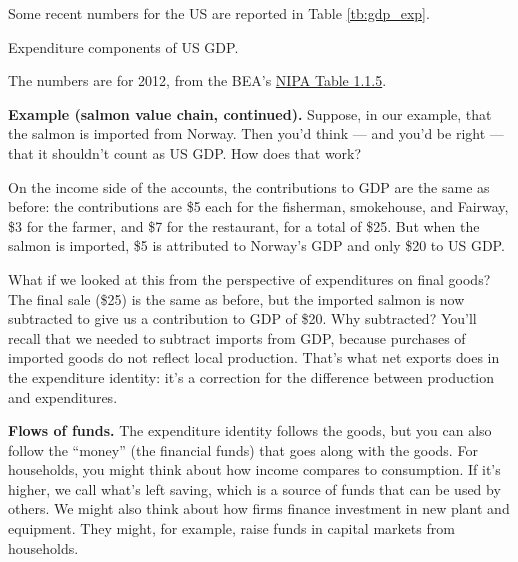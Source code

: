 Some recent numbers for the US are reported in Table \ref{tb:gdp_exp}.

\begin{table}[h!]
\centering
\caption{Expenditure components of US GDP.}
\label{tb:gdp_exp}

\begin{minipage}{0.95\textwidth}
\footnotesize{%
\smallskip
The numbers are for 2012,
from the BEA's
\href{http://www.bea.gov/iTable/iTableHtml.cfm?reqid=9&step=3&isuri=1&903=5}{NIPA Table 1.1.5}.
}
\end{minipage}
\end{table}

\textbf{Example (salmon value chain, continued).}
Suppose, in our example, that the salmon is imported from Norway.
Then you'd think --- and you'd be right --- that it shouldn't
count as US GDP.
How does that work?

On the income side of the accounts, the
contributions to GDP are the same as before:
the contributions are \$5 each for the fisherman,
smokehouse, and Fairway, \$3 for the farmer, and
\$7 for the restaurant, for a total of \$25.
But when the salmon is imported,
\$5 is attributed to Norway's GDP and only \$20 to US GDP.

What if we looked at this from the perspective of expenditures on final goods?
The final sale (\$25) is the same as before, but the imported
salmon is now subtracted to give us a contribution to GDP of \$20.
Why subtracted?  You'll recall that we needed to subtract imports
from GDP, because purchases of imported goods do not reflect
local production.
That's what net exports does in the expenditure identity:
it's a correction for the difference between
production and expenditures.


\textbf{Flows of funds. }
The expenditure identity follows the goods, but you can also follow
the ``money'' (the financial funds) that goes along with the goods.
For households, you might think about how income compares to consumption.
If it's higher, we call what's left saving, which is a source of funds
that can be used by others.
We might also think about how firms finance investment in new plant and equipment.
They might, for example, raise funds in capital markets from households.


